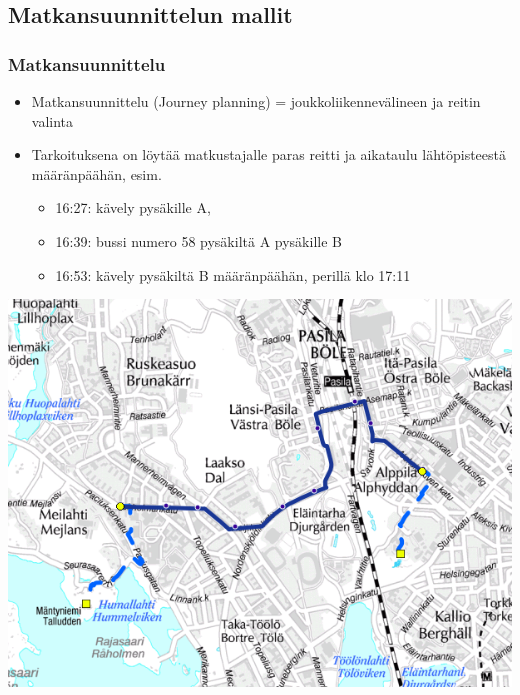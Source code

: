 \documentclass{beamer}
\begin{document}
\subsection{Matkansuunnittelun mallit}
\begin{frame}
  \frametitle{Matkansuunnittelu} 
  \begin{itemize}
   \item 
    Matkansuunnittelu (Journey planning) = joukkoliikennevälineen ja reitin valinta
    \item
    Tarkoituksena on löytää matkustajalle paras reitti ja aikataulu lähtöpisteestä määränpäähän, esim.
    \begin{itemize}
     \item 
     16:27: kävely pysäkille A,
     \item
     16:39: bussi numero 58 pysäkiltä A pysäkille B
     \item
     16:53: kävely pysäkiltä B määränpäähän, perillä klo 17:11
    \end{itemize}
   \end{itemize}
     \begin{center}
      \includegraphics[scale=0.2]{reittiopas01}
      \end{center}
\end{frame} 
\end{document}
